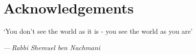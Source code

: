 \documentclass[class=report,11pt,crop=false]{standalone}
\begin{document}
\chapter*{Acknowledgements}
\epigraph{`You don't see the world as it is - you see the world as you are'}%
{\emph{---\,Rabbi Shemuel ben Nachmani}}
\vspace{0.3cm}
\end{document}
